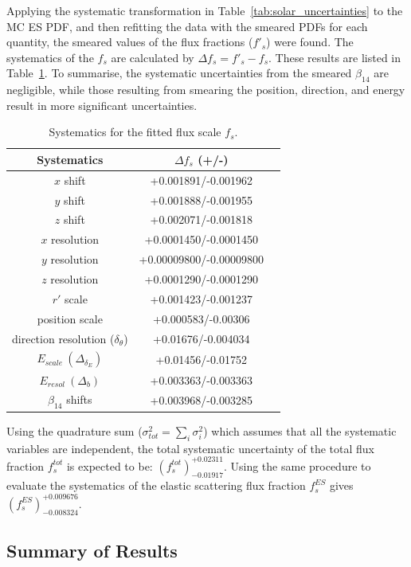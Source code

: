 {Applying the systematic transformation in Table~\ref{tab:solar_uncertainties} to the MC ES PDF, and then refitting the data with the smeared PDFs for each quantity, the smeared values of the flux fractions ($f'_s$) were found. The systematics of the $f_s$ are calculated by $\Delta f_s =f'_s-f_s$. These results are listed in Table~\ref{tab:smearingResults}. To summarise, the systematic uncertainties from the smeared $\beta_{14}$ are negligible, while those resulting from smearing the position, direction, and energy result in more significant uncertainties. 
\begin{table}[ht]
	\centering
	\caption{Systematics for the fitted flux scale $f_s$.\label{tab:smearingResults}}
					\vspace{1mm}
	\begin{tabular*}{90mm}{c@{\extracolsep{\fill}}cc}
		\toprule
		Systematics & $\Delta f_s$ (+/-)\\
		\hline
		$x$ shift & +0.001891/-0.001962\\	
		$y$ shift & +0.001888/-0.001955\\
		$z$ shift & +0.002071/-0.001818\\
		$x$ resolution & +0.0001450/-0.0001450\\	
		$y$ resolution & +0.00009800/-0.00009800\\
		$z$ resolution & +0.0001290/-0.0001290\\
		$r'$ scale & +0.001423/-0.001237\\
		position scale & +0.000583/-0.00306\\	
		direction resolution ($\delta_\theta$)  &+0.01676/-0.004034\\		
		$E_{scale}~(\Delta_{\delta_E})$ & +0.01456/-0.01752\\
		$E_{resol}~(\Delta_b)$ & +0.003363/-0.003363 \\
		$\beta_{14}$ shifts & +0.003968/-0.003285\\
		\bottomrule
	\end{tabular*}
\end{table}

Using the quadrature sum ($\sigma^2_{tot}=\sum_i \sigma^2_i$) which assumes that all the systematic variables are independent, the total systematic uncertainty of the total flux fraction $f^{tot}_s$ is expected to be: $({f^{tot}_s})^{+0.02311}_{-0.01917}$. Using the same procedure to evaluate the systematics of the elastic scattering flux fraction $f^{ES}_s$ gives $({f^{ES}_s})^{+0.009676}_{-0.008324}$.

\subsection{Summary of Results}\label{sect:solarESresults}

}
